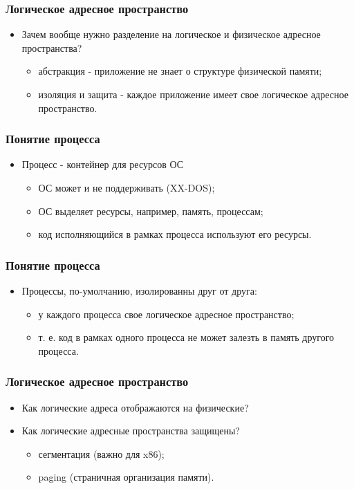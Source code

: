 \begin{frame}
\frametitle{Логическое адресное пространство}
\begin{itemize}
    \item<1->Зачем вообще нужно разделение на логическое и
    физическое адресное пространства?
    \begin{itemize}
        \item<2->абстракция - приложение не знает о структуре
        физической памяти;
        \item<3->изоляция и защита - каждое приложение имеет
        свое логическое адресное пространство.
    \end{itemize}
\end{itemize}
\end{frame}

\begin{frame}
\frametitle{Понятие процесса}
\begin{itemize}
    \item<1->Процесс - контейнер для ресурсов ОС
    \begin{itemize}
        \item<2->ОС может и не поддерживать (XX-DOS);
        \item<3->ОС выделяет ресурсы, например, память, процессам;
        \item<4->код исполняющийся в рамках процесса используют его ресурсы.
    \end{itemize}
\end{itemize}
\end{frame}

\begin{frame}
\frametitle{Понятие процесса}
\begin{itemize}
    \item<1->Процессы, по-умолчанию, изолированны друг от друга:
    \begin{itemize}
        \item<2->у каждого процесса свое логическое адресное пространство;
        \item<3->т. е. код в рамках одного процесса не может залезть
        в память другого процесса.
    \end{itemize}
\end{itemize}
\end{frame}

\begin{frame}
\frametitle{Логическое адресное пространство}
\begin{itemize}
   \item<1->Как логические адреса отображаются на физические?
   \item<1->Как логические адресные пространства защищены?
   \begin{itemize}
       \item<2->сегментация (важно для x86);
       \item<3->paging (страничная организация памяти).
   \end{itemize}
\end{itemize}
\end{frame}

